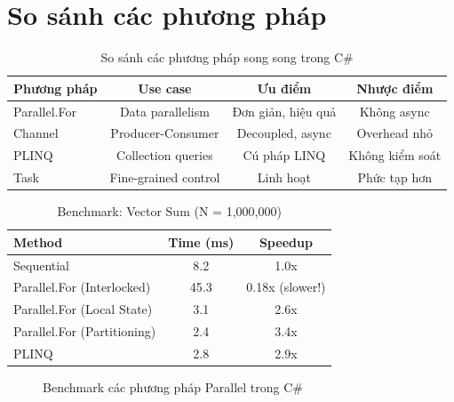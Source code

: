 \section{So sánh các phương pháp}

\begin{table}[H]
\centering
\caption{So sánh các phương pháp song song trong C\#}
\label{tab:csharp_comparison}
\begin{tabular}{@{}lccc@{}}
\toprule
\textbf{Phương pháp} & \textbf{Use case} & \textbf{Ưu điểm} & \textbf{Nhược điểm} \\
\midrule
Parallel.For & Data parallelism & Đơn giản, hiệu quả & Không async \\
Channel & Producer-Consumer & Decoupled, async & Overhead nhỏ \\
PLINQ & Collection queries & Cú pháp LINQ & Không kiểm soát \\
Task & Fine-grained control & Linh hoạt & Phức tạp hơn \\
\bottomrule
\end{tabular}
\end{table}

\begin{table}[H]
\centering
\caption{Benchmark: Vector Sum (N = 1,000,000)}
\label{tab:csharp_benchmark}
\begin{tabular}{@{}lcc@{}}
\toprule
\textbf{Method} & \textbf{Time (ms)} & \textbf{Speedup} \\
\midrule
Sequential & 8.2 & 1.0x \\
Parallel.For (Interlocked) & 45.3 & 0.18x (slower!) \\
Parallel.For (Local State) & 3.1 & 2.6x \\
Parallel.For (Partitioning) & 2.4 & 3.4x \\
PLINQ & 2.8 & 2.9x \\
\bottomrule
\end{tabular}
\end{table}

\begin{figure}[H]
\centering
{}
\caption{Benchmark các phương pháp Parallel trong C\#}
\label{fig:csharp_benchmark}
\end{figure}

